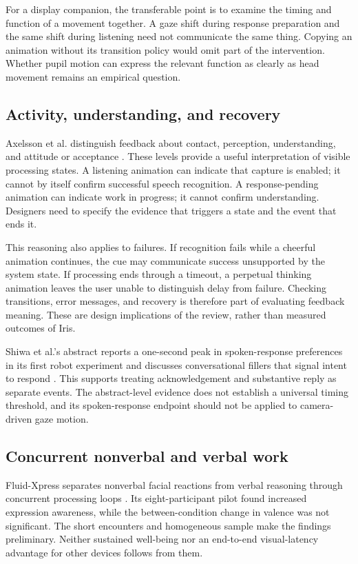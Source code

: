 \documentclass[journal]{IEEEtran}
\begin{document}
For a display companion, the transferable point is to examine the timing and function of a movement together. A gaze shift during response preparation and the same shift during listening need not communicate the same thing. Copying an animation without its transition policy would omit part of the intervention. Whether pupil motion can express the relevant function as clearly as head movement remains an empirical question.

\subsection{Activity, understanding, and recovery}
Axelsson et al. distinguish feedback about contact, perception, understanding, and attitude or acceptance \cite{axelsson2022}. These levels provide a useful interpretation of visible processing states. A listening animation can indicate that capture is enabled; it cannot by itself confirm successful speech recognition. A response-pending animation can indicate work in progress; it cannot confirm understanding. Designers need to specify the evidence that triggers a state and the event that ends it.

This reasoning also applies to failures. If recognition fails while a cheerful animation continues, the cue may communicate success unsupported by the system state. If processing ends through a timeout, a perpetual thinking animation leaves the user unable to distinguish delay from failure. Checking transitions, error messages, and recovery is therefore part of evaluating feedback meaning. These are design implications of the review, rather than measured outcomes of Iris.

Shiwa et al.'s abstract reports a one-second peak in spoken-response preferences in its first robot experiment and discusses conversational fillers that signal intent to respond \cite{shiwa2009}. This supports treating acknowledgement and substantive reply as separate events. The abstract-level evidence does not establish a universal timing threshold, and its spoken-response endpoint should not be applied to camera-driven gaze motion.

\subsection{Concurrent nonverbal and verbal work}
Fluid-Xpress separates nonverbal facial reactions from verbal reasoning through concurrent processing loops \cite{kang2026}. Its eight-participant pilot found increased expression awareness, while the between-condition change in valence was not significant. The short encounters and homogeneous sample make the findings preliminary. Neither sustained well-being nor an end-to-end visual-latency advantage for other devices follows from them.
\end{document}
